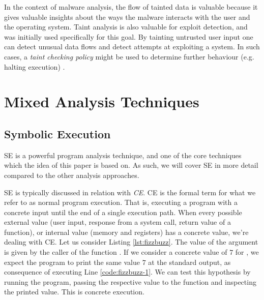 In the context of malware analysis, the flow of tainted data is valuable because it gives valuable insights about the ways the malware interacts with the user and the operating system. Taint analysis is also valuable for exploit detection, and was initially used specifically for this goal. By tainting untrusted user input one can detect unusual data flows and detect attempts at exploiting a system. In such cases, a \emph{taint checking policy} might be used to determine further behaviour (e.g. halting execution) \cite{da_survey_2019} \cite{all_about_taint_2010}.

\section{Mixed Analysis Techniques}

\subsection{Symbolic Execution}

\gls{SE} is a powerful program analysis technique, and one of the core techniques which the idea of this paper is based on. As such, we will cover \gls{SE} in more detail compared to the other analysis approaches.

\gls{SE} is typically discussed in relation with \emph{\gls{CE}}. \gls{CE} is the formal term for what we refer to as normal program execution. That is, executing a program with a concrete input until the end of a single execution path. When every possible external value (user input, response from a system call, return value of a function), or internal value (memory and registers) has a concrete value, we're dealing with \gls{CE}. Let us consider Listing \ref{lst:fizzbuzz}. The value of the argument  is given by the caller of the function . If we consider a concrete value of $7$ for , we expect the program to print the same value $7$ at the standard output, as consequence of executing Line \ref{code:fizzbuzz-1}. We can test this hypothesis by running the program, passing the respective value to the function and inspecting the printed value. This is concrete execution.



